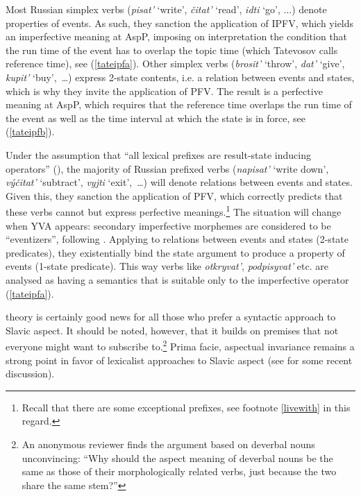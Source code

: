 \documentclass[output=paper,colorlinks,citecolor=brown]{langscibook}
\begin{document}
Most Russian simplex verbs (\textit{pisat'} `write', \textit{čitat'} `read', \textit{idti} `go', ...) denote properties of events. As such, they sanction the application of IPFV, which yields an imperfective meaning at AspP, imposing on interpretation the condition that the run time of the event has to overlap the topic time (which Tatevosov calls reference time), see (\ref{tateipfa}). Other simplex verbs (\textit{brosit'} `throw', \textit{dat'} `give', \textit{kupit'} `buy',~\dots) express 2-state contents, i.e. a relation between events and states, which is why they invite the application of PFV. The result is a perfective meaning at AspP, which requires that the reference time overlaps the run time of the event as well as the time interval at which the state is in force, see (\ref{tateipfb}).

Under the assumption that ``all lexical prefixes are result-state inducing operators'' (\citealt[fn.21]{Tate17}), the majority of Russian prefixed verbs (\textit{napisat'} `write down', \textit{v\'yčitat'} `subtract', \textit{vyjti} `exit',~\dots) will denote relations between events and states. Given this, they sanction the application of PFV, which correctly predicts that these verbs cannot but express perfective meanings.\footnote{Recall that there are some exceptional prefixes, see footnote \ref{livewith} in this regard.} The situation will change when YVA appears: secondary imperfective morphemes are considered to be ``eventizers'', following \citet[345]{Paslawska.Stechow2003}. Applying to relations between events and states (2-state predicates), they existentially bind the state argument to produce a property of events (1-state predicate). This way verbs like \textit{otkryvat'}, \textit{podpisyvat'} etc. are analysed as having a semantics that is suitable only to the imperfective operator (\ref{tateipfa}).

 theory is certainly good news for all those who prefer a syntactic approach to Slavic aspect. 
It should be noted, however, that it builds on premises that not everyone might want to subscribe to.\footnote{\label{krkr}An anonymous reviewer finds the argument based on deverbal nouns unconvincing: ``Why should the aspect meaning of deverbal nouns be the same as those of their morphologically related verbs, just because the two share the same stem?''} Prima facie, aspectual invariance remains a strong point in favor of lexicalist approaches to Slavic aspect (see \citealt{Rothstein20} for some recent discussion). 
\end{document}
